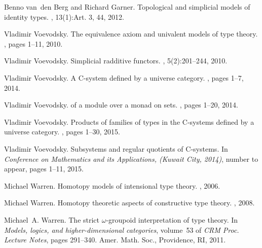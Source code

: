 \documentclass[12pt]{article}
\begin{document}
\begin{thebibliography}{10}
Benno van~den Berg and Richard Garner.
\newblock Topological and simplicial models of identity types.
, 13(1):Art. 3, 44, 2012.

Vladimir Voevodsky.
\newblock The equivalence axiom and univalent models of type theory.
, pages 1--11, 2010.

Vladimir Voevodsky.
\newblock Simplicial radditive functors.
, 5(2):201--244, 2010.

Vladimir Voevodsky.
\newblock A {C-system} defined by a universe category.
, pages 1--7, 2014.

Vladimir Voevodsky.
 of a module over a monad on sets.
, pages 1--20, 2014.

Vladimir Voevodsky.
\newblock Products of families of types in the {C-systems} defined by a
  universe category.
, pages 1--30, 2015.

Vladimir Voevodsky.
\newblock Subsystems and regular quotients of {C-systems}.
\newblock In {\em Conference on Mathematics and its Applications, (Kuwait City,
  2014)}, number to appear, pages 1--11, 2015.

Michael Warren.
\newblock Homotopy models of intensional type theory.
, 2006.

Michael Warren.
\newblock Homotopy theoretic aspects of constructive type theory.
, 2008.

Michael~A. Warren.
\newblock The strict {$\omega$}-groupoid interpretation of type theory.
\newblock In {\em Models, logics, and higher-dimensional categories}, volume~53
  of {\em CRM Proc. Lecture Notes}, pages 291--340. Amer. Math. Soc.,
  Providence, RI, 2011.

\end{thebibliography}


%
%
\end{document}
